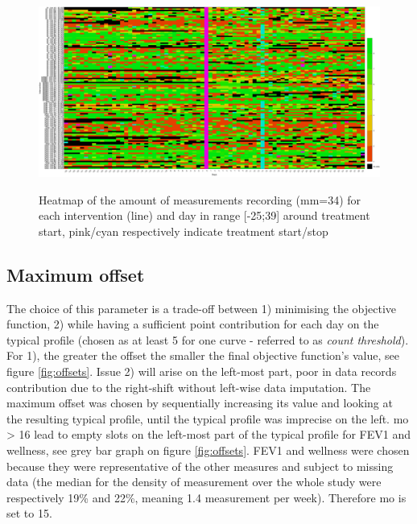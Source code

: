 \begin{figure}[!h]
    \caption{Heatmap of the amount of measurements recording (mm=34) for each intervention (line) and day in range [-25;39] around treatment start, pink/cyan respectively indicate treatment start/stop}
    \centering
    \includegraphics[width=150mm]{images/heatmapmm.png}
    \label{fig:heatmap}
\end{figure}

\subsection{Maximum offset}
The choice of this parameter is a trade-off between 1) minimising the objective function, 2) while having a sufficient point contribution for each day on the typical profile (chosen as at least 5 for one curve - referred to as \textit{count threshold}). For 1), the greater the offset the smaller the final objective function's value, see figure \ref{fig:offsets}. Issue 2) will arise on the left-most part, poor in data records contribution due to the right-shift without left-wise data imputation. The maximum offset was chosen by sequentially increasing its value and looking at the resulting typical profile, until the typical profile was imprecise on the left. mo > 16 lead to empty slots on the left-most part of the typical profile for FEV1 and wellness, see grey bar graph on figure \ref{fig:offsets}. FEV1 and wellness were chosen because they were representative of the other measures and subject to missing data (the median for the density of measurement over the whole study were respectively 19\% and 22\%, meaning 1.4 measurement per week). Therefore mo is set to 15.

